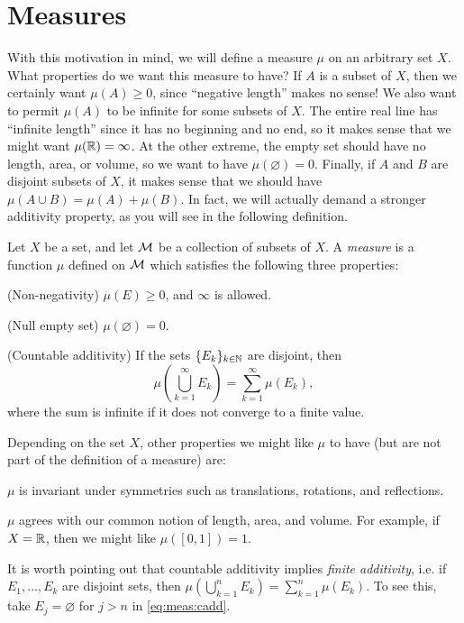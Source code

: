\documentclass[main.tex]{subfiles}
\begin{document}
\section{Measures}

With this motivation in mind, we will define a measure $\mu$ on an arbitrary set $X$. What properties do we want this measure to have? If $A$ is a subset of $X$, then we certainly want $\mu(A) \geq 0$, since ``negative length'' makes no sense! We also want to permit $\mu(A)$ to be infinite for some subsets of $X$. The entire real line has ``infinite length'' since it has no beginning and no end, so it makes sense that we might want $\mu({\mathbb R}) = \infty$. At the other extreme, the empty set should have no length, area, or volume, so we want to have $\mu(\varnothing) = 0$. Finally, if $A$ and $B$ are disjoint subsets of $X$, it makes sense that we should have $\mu(A\cup B) = \mu(A) + \mu(B)$. In fact, we will actually demand a stronger additivity property, as you will see in the following definition.

\begin{definition}\label{def:measure}
Let $X$ be a set, and let ${\mathcal M}$ be a collection of subsets of $X$. A \emph{measure} is a function $\mu$ defined on ${\mathcal M}$ which satisfies the following three properties:
\begin{romannum}
\item (Non-negativity) $\mu(E) \geq 0$, and $\infty$ is allowed.
\item (Null empty set) $\mu(\varnothing) = 0$.
\item (Countable additivity) If the sets $\{E_k\}_{k \in {\mathbb N}}$ are disjoint, then 
	\begin{equation}\label{eq:meas:cadd}
	\mu \left( \bigcup_{k=1}^\infty E_k \right) = \sum_{k=1}^\infty \mu(E_k),
	\end{equation}
	where the sum is infinite if it does not converge to a finite value. 
\end{romannum}
\end{definition}
Depending on the set $X$, other properties we might like $\mu$ to have (but are not part of the definition of a measure) are:
\begin{romannum}
\setcounter{rmnum}{3}
\item $\mu$ is invariant under symmetries such as translations, rotations, and reflections.
\item $\mu$ agrees with our common notion of length, area, and volume. For example, if $X = {\mathbb R}$, then we might like $\mu([0,1]) = 1$.
\end{romannum}
It is worth pointing out that countable additivity implies \emph{finite additivity}, i.e. if $E_1, \dots, E_k$ are disjoint sets, then $\mu \left( \bigcup_{k=1}^n E_k \right) = \sum_{k=1}^n \mu(E_k)$. To see this, take $E_j = \varnothing$ for $j > n$ in \cref{eq:meas:cadd}.
\end{document}
